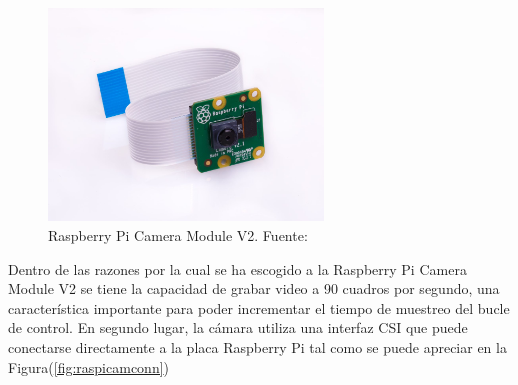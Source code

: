         \begin{figure}[!h] 
            \centering
            \includegraphics[width=0.65\textwidth]{img/raspicam}
            \caption[Raspberry Pi Camera Module V2]{Raspberry Pi Camera Module V2. Fuente: \cite{raspicam} }
            \label{fig:raspicam}
        \end{figure}

        \begin{table}[!h]
            \centering
            \caption{Características de la Raspberry Pi Camera Module V2. Fuente: \cite{raspicam}}
            \label{tbl:raspicamspecs}
            \end{table}
        
        Dentro de las razones por la cual se ha escogido a la Raspberry Pi Camera Module V2 se tiene la capacidad de 
        grabar video a 90 cuadros por segundo, una característica importante para poder incrementar el tiempo de muestreo del 
        bucle de control. En segundo lugar, la cámara utiliza una interfaz CSI que puede conectarse directamente a la placa Raspberry
        Pi tal como se puede apreciar en la Figura(\ref{fig:raspicamconn})
        
